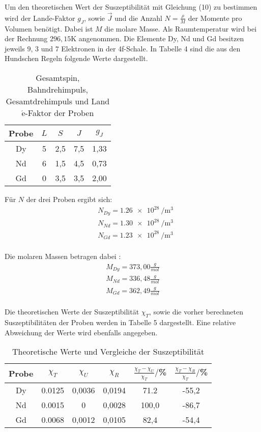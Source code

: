 Um den theoretischen Wert der Suszeptibilität mit Gleichung (10) zu bestimmen wird der Land$\acute{\text{e}}$-Faktor $g_J$, sowie $\vec{J}$ und
die Anzahl $N= \frac{\rho}{M}$ der Momente pro Volumen benötigt. Dabei ist $M$ die molare Masse. Als Raumtemperatur wird bei der
Rechnung $296,15$K angenommen. Die Elemente Dy, Nd und Gd besitzen jeweils $9$, $3$ und $7$ Elektronen in der 4f-Schale. In Tabelle 4
sind die aus den Hundschen Regeln folgende Werte dargestellt.

\begin{table}[H]
  \centering
  \caption{Gesamtspin, Bahndrehimpuls, Gesamtdrehimpuls und Land$\acute{\text{e}}$-Faktor der Proben}
  \label{tab:Dy}
  \begin{tabular}{c c c c c}
    \toprule
    Probe & $L$ & $S$ & $J$  & $g_J$  \\
    \midrule
    Dy & 5 & 2,5 & 7,5 & 1,33\\
    Nd & 6 & 1,5 & 4,5 & 0,73\\
    Gd & 0 & 3,5 & 3,5 & 2,00\\
    \bottomrule
  \end{tabular}
\end{table}

Für $N$ der drei Proben ergibt sich:
\begin{align*}
  &N_{Dy} = \SI{1.26e28}{\per\meter^3} \\ %
  &N_{Nd} = \SI{1.30e28}{\per\meter^3} \\ %
  &N_{Gd} = \SI{1.23e28}{\per\meter^3} \\ %
\end{align*}

Die molaren Massen betragen dabei \cite{sample1}:
\begin{align*}
  M_{Dy} = 373,00 \frac{g}{mol} \\
  M_{Nd} = 336,48 \frac{g}{mol} \\
  M_{Gd} = 362,49 \frac{g}{mol} \\
\end{align*}

Die theoretischen Werte der Suszeptibilität $\chi_T$, sowie die vorher berechneten Suszeptibilitäten
der Proben werden in Tabelle 5 dargestellt. Eine relative Abweichung der Werte wird ebenfalls angegeben.

\begin{table}[H]
  \centering
  \caption{Theoretische Werte und Vergleiche der Suszeptibilität}
  \label{tab:Dy}
  \begin{tabular}{c c c c c c}
    \toprule
    Probe & $\chi_T$ & $\chi_U$ & $\chi_R$ & $\frac{\chi_T - \chi_U}{\chi_T}/$\%  & $\frac{\chi_T - \chi_R}{\chi_T}/$\% \\
    \midrule
    Dy & 0.0125 & 0,0036 & 0,0194 & 71.2 & -55,2\\  %
    Nd & 0.0015 & 0 & 0,0028 & 100,0 & -86,7\\      %
    Gd & 0.0068 & 0,0012 &  0,0105 & 82,4 & -54,4\\   %
    \bottomrule
  \end{tabular}
\end{table}
